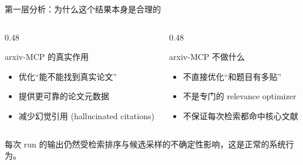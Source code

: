 \documentclass[UTF8,fontset=fandol,aspectratio=169]{ctexbeamer}
\begin{document}
\begin{frame}{第一层分析：为什么这个结果本身是合理的}
  \begin{columns}[T,onlytextwidth]
    \begin{column}{0.48\textwidth}
      \begin{block}{arxiv-MCP 的真实作用}
        \begin{itemize}
          \item 优化“能不能找到真实论文”
          \item 提供更可靠的论文元数据
          \item 减少幻觉引用 (hallucinated citations)
        \end{itemize}
      \end{block}
    \end{column}
    \begin{column}{0.48\textwidth}
      \begin{block}{arxiv-MCP 不做什么}
        \begin{itemize}
          \item 不直接优化“和题目有多贴”
          \item 不是专门的 relevance optimizer
          \item 不保证每次检索都命中核心文献
        \end{itemize}
      \end{block}
    \end{column}
  \end{columns}

  \vspace{0.5em}
  \begin{center}
  \end{center}

  \vspace{0.3em}
  每次 run 的输出仍然受检索排序与候选采样的不确定性影响，这是正常的系统行为。
\end{frame}
\end{document}
